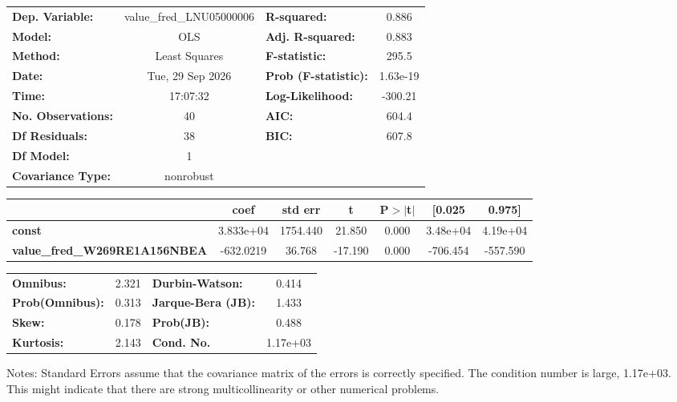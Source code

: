 \begin{center}
\begin{tabular}{lclc}
\toprule
\textbf{Dep. Variable:}               & value\_fred\_LNU05000006 & \textbf{  R-squared:         } &     0.886   \\
\textbf{Model:}                       &           OLS            & \textbf{  Adj. R-squared:    } &     0.883   \\
\textbf{Method:}                      &      Least Squares       & \textbf{  F-statistic:       } &     295.5   \\
\textbf{Date:}                        &     Tue, 29 Sep 2026     & \textbf{  Prob (F-statistic):} &  1.63e-19   \\
\textbf{Time:}                        &         17:07:32         & \textbf{  Log-Likelihood:    } &   -300.21   \\
\textbf{No. Observations:}            &              40          & \textbf{  AIC:               } &     604.4   \\
\textbf{Df Residuals:}                &              38          & \textbf{  BIC:               } &     607.8   \\
\textbf{Df Model:}                    &               1          & \textbf{                     } &             \\
\textbf{Covariance Type:}             &        nonrobust         & \textbf{                     } &             \\
\bottomrule
\end{tabular}
\begin{tabular}{lcccccc}
                                      & \textbf{coef} & \textbf{std err} & \textbf{t} & \textbf{P$> |$t$|$} & \textbf{[0.025} & \textbf{0.975]}  \\
\midrule
\textbf{const}                        &    3.833e+04  &     1754.440     &    21.850  &         0.000        &     3.48e+04    &     4.19e+04     \\
\textbf{value\_fred\_W269RE1A156NBEA} &    -632.0219  &       36.768     &   -17.190  &         0.000        &     -706.454    &     -557.590     \\
\bottomrule
\end{tabular}
\begin{tabular}{lclc}
\textbf{Omnibus:}       &  2.321 & \textbf{  Durbin-Watson:     } &    0.414  \\
\textbf{Prob(Omnibus):} &  0.313 & \textbf{  Jarque-Bera (JB):  } &    1.433  \\
\textbf{Skew:}          &  0.178 & \textbf{  Prob(JB):          } &    0.488  \\
\textbf{Kurtosis:}      &  2.143 & \textbf{  Cond. No.          } & 1.17e+03  \\
\bottomrule
\end{tabular}
\end{center}

Notes: \newline
 [1] Standard Errors assume that the covariance matrix of the errors is correctly specified. \newline
 [2] The condition number is large, 1.17e+03. This might indicate that there are \newline
 strong multicollinearity or other numerical problems.